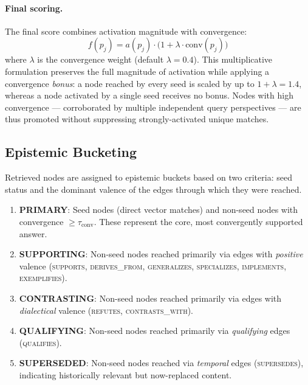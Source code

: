 \documentclass[11pt,a4paper]{article}
\begin{document}
\paragraph{Final scoring.}
The final score combines activation magnitude with convergence:
\[
  f(p_j) = a(p_j) \cdot \bigl(1 + \lambda \cdot \text{conv}(p_j)\bigr)
\]
where $\lambda$ is the convergence weight (default $\lambda = 0.4$).
This multiplicative formulation preserves the full magnitude of
activation while applying a convergence \emph{bonus}: a node reached by
every seed is scaled by up to $1 + \lambda = 1.4$, whereas a node
activated by a single seed receives no bonus.  Nodes with high
convergence — corroborated by multiple independent query perspectives —
are thus promoted without suppressing strongly-activated unique matches.

\subsection{Epistemic Bucketing}
\label{sec:bucketing}

Retrieved nodes are assigned to epistemic buckets based on two criteria:
seed status and the dominant valence of the edges through which they
were reached.

\begin{enumerate}[leftmargin=*]
  \item \textbf{PRIMARY}: Seed nodes (direct vector matches) and
        non-seed nodes with convergence $\geq \tau_\text{conv}$.
        These represent the core, most convergently supported answer.

  \item \textbf{SUPPORTING}: Non-seed nodes reached primarily via
        edges with \emph{positive} valence
        (\textsc{supports}, \textsc{derives\_from}, \textsc{generalizes},
        \textsc{specializes}, \textsc{implements}, \textsc{exemplifies}).

  \item \textbf{CONTRASTING}: Non-seed nodes reached primarily via
        edges with \emph{dialectical} valence
        (\textsc{refutes}, \textsc{contrasts\_with}).

  \item \textbf{QUALIFYING}: Non-seed nodes reached primarily via
        \emph{qualifying} edges (\textsc{qualifies}).

  \item \textbf{SUPERSEDED}: Non-seed nodes reached via
        \emph{temporal} edges (\textsc{supersedes}),
        indicating historically relevant but now-replaced content.
\end{enumerate}
\end{document}
